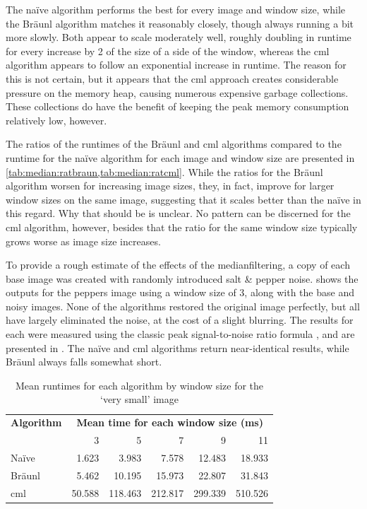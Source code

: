 The naïve algorithm performs the best for every image and window size, while the Bräunl algorithm matches it reasonably closely, though always running a bit more slowly.  Both appear to scale moderately well, roughly doubling in runtime for every increase by 2 of the size of a side of the window, whereas the \gls{cml} algorithm appears to follow an exponential increase in runtime.  The reason for this is not certain, but it appears that the \gls{cml} approach creates considerable pressure on the memory heap, causing numerous expensive garbage collections.  These collections do have the benefit of keeping the peak memory consumption relatively low, however.

The ratios of the runtimes of the Bräunl and \gls{cml} algorithms compared to the runtime for the naïve algorithm for each image and window size are presented in \cref{tab:median:ratbraun,tab:median:ratcml}.  While the ratios for the Bräunl algorithm worsen for increasing image sizes, they, in fact, improve for larger window sizes on the same image, suggesting that it scales better than the naïve in this regard.  Why that should be is unclear.  No pattern can be discerned for the \gls{cml} algorithm, however, besides that the ratio for the same window size typically grows worse as image size increases.

To provide a rough estimate of the effects of the \gls{medianfilter}ing, a copy of each base image was created with randomly introduced salt \& pepper noise.   shows the outputs for the peppers image using a window size of 3, along with the base and noisy images.  None of the algorithms restored the original image perfectly, but all have largely eliminated the noise, at the cost of a slight blurring.  The results for each were measured using the classic peak signal-to-noise ratio formula \cite{Boncelet2005}, and are presented in .  The naïve and \gls{cml} algorithms return near-identical results, while Bräunl always falls somewhat short.

\begin{table}
\centering
\begin{tabular}{@{}lrrrrr@{}}
\toprule
\multicolumn{1}{c}{\textbf{Algorithm}} & \multicolumn{5}{c}{\textbf{Mean time for each window size (ms)}} \\
                              & 3        & 5         & 7         & 9         & 11       \\ \midrule
Naïve                         & 1.623    & 3.983     & 7.578     & 12.483    & 18.933   \\
Bräunl                        & 5.462    & 10.195    & 15.973    & 22.807    & 31.843   \\
\gls{cml}                           & 50.588   & 118.463   & 212.817   & 299.339   & 510.526  \\ \bottomrule
\end{tabular}
\caption[Mean runtimes for each algorithm for the `very small' image]{Mean runtimes for each algorithm by window size for the `very small' image}
\label{tab:median:verysmall}
\end{table}


